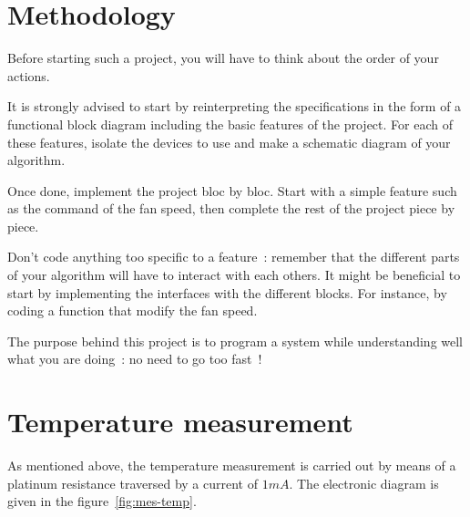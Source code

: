 \documentclass[11pt,a4paper]{article}
\theoremstyle{definition}%
\begin{document}
\section{Methodology}
Before starting such a project, you will have to think about the order of your actions.

It is strongly advised to start by reinterpreting the specifications in the form of a functional block diagram including the basic features of the project.
For each of these features, isolate the devices to use and make a schematic diagram of your algorithm.

Once done, implement the project bloc by bloc.
Start with a simple feature such as the command of the fan speed, then complete the rest of the project piece by piece.

Don't code anything too specific to a feature~: remember that the different parts of your algorithm will have to interact with each others.
It might be beneficial to start by implementing the interfaces with the different blocks.
For instance, by coding a function that modify the fan speed.

The purpose behind this project is to program a system while understanding well what you are doing~: no need to go too fast~!





\section{Temperature measurement}

As mentioned above, the temperature measurement is carried out by means of a platinum resistance traversed by a current of $ 1 mA $.
The electronic diagram is given in the figure~\ref{fig:mes-temp}.
\end{document}
